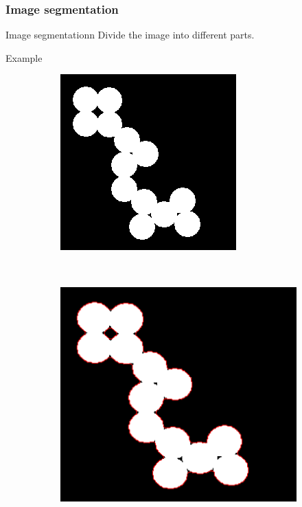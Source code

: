 \documentclass[11pt]{beamer}
\begin{document}
\begin{frame}
\frametitle{Image segmentation}

\begin{block}{Image segmentationn}
Divide the image into different parts.
\end{block}

\begin{exampleblock}{Example}
\begin{figure}
    \centering
    \begin{subfigure}[b]{0.36\textwidth}
        \includegraphics[width=\textwidth]{circles}

    \end{subfigure}
    ~ 
        \begin{subfigure}[b]{0.4\textwidth}
        \includegraphics[width=\textwidth]{circles_segmented}


\end{subfigure}
\end{figure}
\end{exampleblock}
\end{frame}
\end{document}
